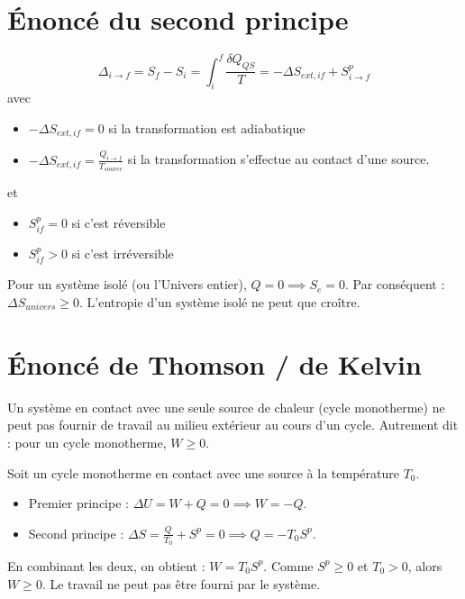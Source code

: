 \documentclass[french]{yLectureNote}
\begin{document}
\section{Énoncé du second principe}
\begin{theorem}
    $$\Delta_{i\to f} = S_f-S_i = \int_i^f \frac{\delta Q_{QS}}{T} = -\Delta S_{ext, if}+S^p_{i\to f}$$
    avec 
    \begin{itemize}
        \item $-\Delta S_{ext,if} = 0$ si la transformation est adiabatique
        \item $-\Delta S_{ext,if} = \frac{Q_{i\to f}}{T_{source}}$ si la transformation s'effectue au contact d'une source.
    \end{itemize}
      et
      \begin{itemize}
        \item $S^p_{if}=0$ si c'est réversible
        \item $S^p_{if}>0$ si c'est irréversible
      \end{itemize}
\end{theorem}

\begin{theorem}
    Pour un système isolé (ou l'Univers entier), $Q=0 \implies S_e = 0$.
    Par conséquent : $\Delta S_{univers} \geq 0$.
    L'entropie d'un système isolé ne peut que croître.
\end{theorem}

\section{Énoncé de Thomson / de Kelvin}


\begin{theorem}
    Un système en contact avec une seule source de chaleur (cycle monotherme) ne peut pas fournir de travail au milieu extérieur au cours d'un cycle. 
    Autrement dit : pour un cycle monotherme, $W \geq 0$.
\end{theorem}

\begin{myproof}
    Soit un cycle monotherme en contact avec une source à la température $T_0$.
    \begin{itemize}
        \item Premier principe : $\Delta U = W + Q = 0 \implies W = -Q$.
        \item Second principe : $\Delta S = \frac{Q}{T_0} + S^p = 0 \implies Q = -T_0 S^p$.
    \end{itemize}
    En combinant les deux, on obtient : $W = T_0 S^p$.
    Comme $S^p \geq 0$ et $T_0 > 0$, alors $W \geq 0$. Le travail ne peut pas être fourni par le système.
\end{myproof}
\end{document}
